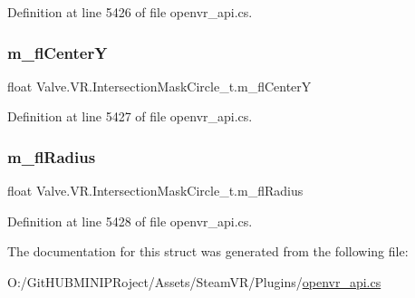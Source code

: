 Definition at line 5426 of file openvr\+\_\+api.\+cs.

\mbox{\label{struct_valve_1_1_v_r_1_1_intersection_mask_circle__t_a457440e8e3ec52898233884bb9aaee23}} 
\subsubsection{\texorpdfstring{m\_flCenterY}{m\_flCenterY}}
{\footnotesize\ttfamily float Valve.\+V\+R.\+Intersection\+Mask\+Circle\+\_\+t.\+m\+\_\+fl\+CenterY}



Definition at line 5427 of file openvr\+\_\+api.\+cs.

\mbox{\label{struct_valve_1_1_v_r_1_1_intersection_mask_circle__t_a2e24ed7129c3e2a7ef7015ebb15b6631}} 
\subsubsection{\texorpdfstring{m\_flRadius}{m\_flRadius}}
{\footnotesize\ttfamily float Valve.\+V\+R.\+Intersection\+Mask\+Circle\+\_\+t.\+m\+\_\+fl\+Radius}



Definition at line 5428 of file openvr\+\_\+api.\+cs.



The documentation for this struct was generated from the following file\+:\begin{DoxyCompactItemize}
\item 
O\+:/\+Git\+H\+U\+B\+M\+I\+N\+I\+P\+Roject/\+Assets/\+Steam\+V\+R/\+Plugins/\mbox{\hyperlink{openvr__api_8cs}{openvr\+\_\+api.\+cs}}\end{DoxyCompactItemize}
